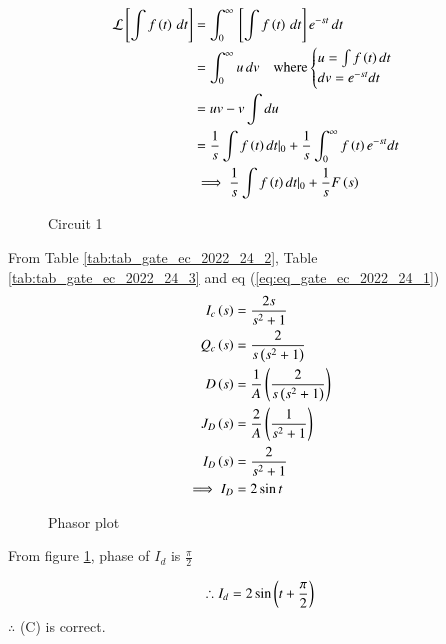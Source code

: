 \documentclass[journal,12pt,twocolumn]{IEEEtran}
\begin{document}
\begin{align}
    \mathcal{L}{}\left[\int f\left(t\right)\, dt\right] &= \int_{0}^{\infty}{}\left[\int f\left(t\right)\, dt\right]e^{-st}\, dt\\
    &= \int_{0}^{\infty}u\, dv \quad \text{where}\begin{cases}
  u =\int f\left(t\right)dt \\
  dv  =e^{-st}dt
\end{cases}\\
&= uv - v\int du\\
&= \frac{1}{s}\int f\left(t\right)dt|_0 + \frac{1}{s}\int_{0}^{\infty}f\left(t\right)e^{-st}dt\\
&\implies \frac{1}{s}\int f\left(t\right)dt|_0 + \frac{1}{s}F\left(s\right) \label{eq:eq_gate_ec_2022_24_1}
\end{align}


\begin{figure}[ht]
  \centering
      
  \caption{Circuit 1}
\end{figure}

From Table \ref{tab:tab_gate_ec_2022_24_2}, Table \ref{tab:tab_gate_ec_2022_24_3} and eq (\ref{eq:eq_gate_ec_2022_24_1})
\begin{align}
    I_c\left(s\right) &= \frac{2s}{s^2 + 1}\\
    Q_c\left(s\right) &= \frac{2}{s\left(s^2 + 1\right)}\\
    D\left(s\right) &= \frac{1}{A}\left(\frac{2}{s\left(s^2 + 1\right)}\right)\\
    J_D\left(s\right) &= \frac{2}{A}\left(\frac{1}{s^2 + 1}\right)\\
    I_D\left(s\right) &= \frac{2}{s^2 + 1}\\
    \implies I_D &= 2\sin{t}
\end{align}


\begin{figure}[ht]
  \centering
      
  \caption{Phasor plot}
  \label{fig:fig_gate_ec_2022_24_1}
\end{figure}

From figure \ref{fig:fig_gate_ec_2022_24_1}, phase of $I_d$ is $\frac{\pi}{2}$

\begin{align}
    \therefore I_d = 2\sin\left(t + \frac{\pi}{2}\right)
\end{align}
$\therefore$ (C) is correct.


\end{document}
